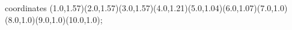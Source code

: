 					coordinates { (1.0,1.57)(2.0,1.57)(3.0,1.57)(4.0,1.21)(5.0,1.04)(6.0,1.07)(7.0,1.0)(8.0,1.0)(9.0,1.0)(10.0,1.0)};